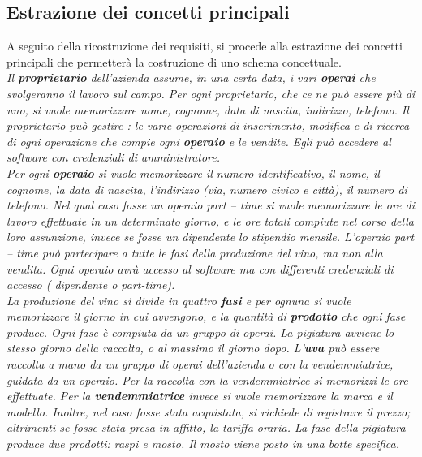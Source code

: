 \documentclass{article}
\begin{document}
\newpage

\newpage
\subsection{Estrazione dei concetti principali}
A seguito della ricostruzione dei requisiti, si procede alla estrazione dei concetti principali che permetterà la costruzione di uno schema concettuale.\\
\newline
\newline
\textit{Il \textbf{proprietario} dell'azienda assume, in una certa data, i vari \textbf{operai} che svolgeranno il lavoro sul campo. Per ogni proprietario, che ce ne può essere più di uno, si vuole memorizzare nome, cognome, data di nascita, indirizzo, telefono.
Il proprietario può gestire : le varie operazioni di inserimento, modifica e di ricerca di ogni operazione che compie ogni \textbf{operaio} e le vendite. Egli può accedere al software con credenziali di amministratore.\\
Per ogni \textbf{operaio} si vuole memorizzare il numero identificativo, il nome, il cognome, la data di nascita, l'indirizzo (via, numero civico e città), il numero di telefono.
Nel qual caso fosse un operaio part – time si vuole memorizzare le ore di lavoro effettuate in un determinato giorno, e le ore totali compiute nel corso della loro assunzione, invece se fosse un dipendente lo stipendio mensile.
L'operaio part – time può partecipare a tutte le fasi della produzione del vino, ma non alla vendita.
Ogni operaio avrà accesso al software ma con differenti credenziali di accesso ( dipendente o part-time).\\\newline
La produzione del vino si divide in quattro \textbf{fasi} e per ognuna si vuole memorizzare il giorno in cui avvengono, e la quantità di \textbf{prodotto} che ogni fase produce. Ogni fase è compiuta da un gruppo di operai. La pigiatura avviene lo stesso giorno della raccolta, o al massimo il giorno dopo.
L’\textbf{uva} può essere raccolta a mano da un gruppo di operai dell'azienda o con la vendemmiatrice, guidata da un operaio.
Per la raccolta con la vendemmiatrice si memorizzi le ore effettuate.
Per la \textbf{vendemmiatrice} invece si vuole memorizzare la marca e il modello. Inoltre, nel caso fosse stata acquistata, si richiede di registrare il prezzo; altrimenti se fosse stata presa in affitto, la tariffa oraria.
La fase della pigiatura produce due prodotti: raspi e mosto. Il mosto viene posto in una botte specifica.
}
\end{document}
